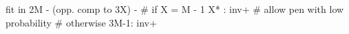 fit in 2M - (opp. comp to 3X) - 
# if X = M - 1
X*  : inv+  # allow pen with low probability
# otherwise
3M-1: inv+